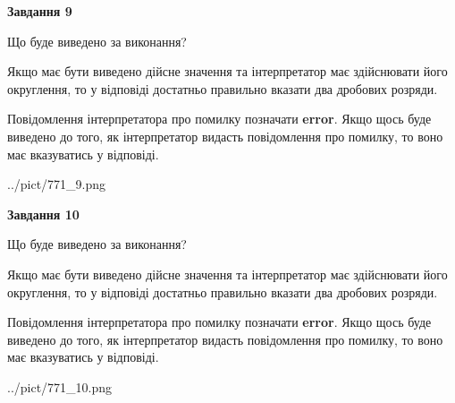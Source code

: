 \documentclass[12pt, ukrainian]{article}
\begin{document}
{\begin {Large}
{\begin {center}\textbf{Завдання 9}\end {center}}\par
Що буде виведено за виконання? \par

Якщо має бути виведено дійсне значення та інтерпретатор має здійснювати його округлення, 
то у відповіді достатньо правильно вказати два дробових розряди.

Повідомлення інтерпретатора про помилку позначати \textbf{error}.
Якщо щось буде виведено до того, як інтерпретатор видасть повідомлення про помилку, 
то воно має вказуватись у відповіді. \par

\begin{center}
	{../pict/771_9.png}
\end{center}
\newpage

{\begin {center}\textbf{Завдання 10}\end {center}}\par
Що буде виведено за виконання? \par

Якщо має бути виведено дійсне значення та інтерпретатор має здійснювати його округлення, 
то у відповіді достатньо правильно вказати два дробових розряди.

Повідомлення інтерпретатора про помилку позначати \textbf{error}.
Якщо щось буде виведено до того, як інтерпретатор видасть повідомлення про помилку, 
то воно має вказуватись у відповіді. \par

\begin{center}
	{../pict/771_10.png}
\end{center}
\newpage

\end {Large}}
\end{document}
